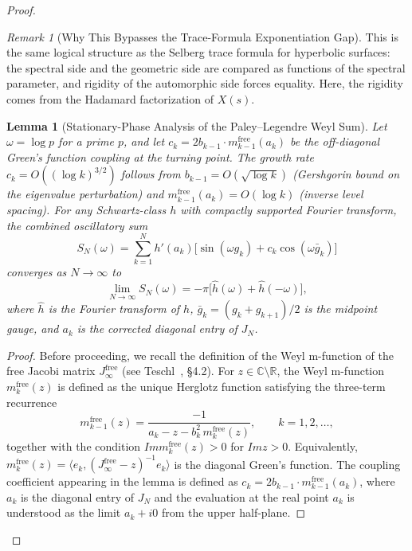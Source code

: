 \documentclass{pre-aomart}
\def\Im{Im}%
\def\xi{X}%
\theoremstyle{plain}
\newtheorem{lemma}[theorem]{Lemma}
\theoremstyle{definition}
\theoremstyle{remark}
\newtheorem{remark}[theorem]{Remark}
\begin{document}
\begin{proof}
\begin{remark}[Why This Bypasses the Trace-Formula Exponentiation Gap]
This is the same logical structure as the Selberg trace formula for
hyperbolic surfaces: the spectral side and the geometric side are compared
as functions of the spectral parameter, and rigidity of the automorphic
side forces equality.  Here, the rigidity comes from the Hadamard
factorization of $\xi(s)$.
\end{remark}

\begin{lemma}[Stationary-Phase Analysis of the Paley--Legendre Weyl Sum]\label{lem:stationary_phase}
Let $\omega = \log p$ for a prime $p$, and let $c_k = 2b_{k-1} \cdot m_{k-1}^{\mathrm{free}}(a_k)$
be the off-diagonal Green's function coupling at the turning point.
The growth rate $c_k = O((\log k)^{3/2})$ follows from
$b_{k-1} = O(\sqrt{\log k})$ (Gershgorin bound on the eigenvalue
perturbation) and
$m_{k-1}^{\mathrm{free}}(a_k) = O(\log k)$ (inverse level spacing).
For any Schwartz-class $h$ with compactly supported
Fourier transform, the combined oscillatory sum
\begin{equation}\label{eq:weyl_combined}
S_N(\omega) = \sum_{k=1}^N h'(a_k)\bigl[\sin(\omega g_k) + c_k \cos(\omega \bar{g}_k)\bigr]
\end{equation}
converges as $N \to \infty$ to
\[
\lim_{N\to\infty} S_N(\omega)
  = -\pi\bigl[\hat{h}(\omega) + \hat{h}(-\omega)\bigr],
\]
where $\hat{h}$ is the Fourier transform of $h$,
$\bar{g}_k = (g_k + g_{k+1})/2$ is the midpoint gauge, and $a_k$ is the
corrected diagonal entry of $J_N$.
\end{lemma}

\begin{proof}
Before proceeding, we recall the definition of the Weyl m-function of the
free Jacobi matrix $J_\infty^{\mathrm{free}}$ (see Teschl~\cite{Teschl2000}, \S4.2).
For $z \in \mathbb{C}\setminus\mathbb{R}$, the Weyl m-function $m_k^{\mathrm{free}}(z)$
is defined as the unique Herglotz function satisfying the three-term recurrence
\begin{equation}\label{eq:m_recurrence}
m_{k-1}^{\mathrm{free}}(z) = \frac{-1}{a_k - z - b_k^2\, m_k^{\mathrm{free}}(z)},
\qquad k = 1, 2, \dots,
\end{equation}
together with the condition $\Im m_k^{\mathrm{free}}(z) > 0$ for $\Im z > 0$.
Equivalently, $m_k^{\mathrm{free}}(z) = \langle e_k, (J_\infty^{\mathrm{free}} - z)^{-1} e_k \rangle$
is the diagonal Green's function.  The coupling coefficient appearing in
the lemma is defined as $c_k = 2b_{k-1} \cdot m_{k-1}^{\mathrm{free}}(a_k)$,
where $a_k$ is the diagonal entry of $J_N$ and the evaluation at the real
point $a_k$ is understood as the limit $a_k + i0$ from the upper half-plane.


\end{proof}
\end{proof}
\end{document}
